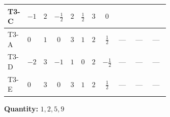 \documentclass[8pt]{article}
\begin{document}
\begin{landscape}
\begin{longtable}{@{}llcccccc >{\raggedright\arraybackslash}p{0.21\linewidth} >{\raggedright\arraybackslash}p{0.21\linewidth} >{\raggedright\arraybackslash}p{0.21\linewidth}@{}}
T3-C & $-1$ & $2$ & $-\frac{1}{2}$ & $2$ & $\frac{1}{2}$ & $3$ & $0$ & \scriptsize\adjustbox{max width=\linewidth}{$\begin{gathered} - \frac{lambda12Inv2 \overline{y_{1}} \overline{y_{2}}}{6 MF}\end{gathered}$} & \scriptsize\adjustbox{max width=\linewidth}{$\begin{gathered} - \frac{\sqrt{3} g_{2}^{2} \overline{y_{1}} \overline{y_{2}}}{8 MF}\end{gathered}$} & \scriptsize\adjustbox{max width=\linewidth}{$\begin{gathered} \frac{\sqrt{3} ye \overline{y_{1}} \overline{y_{2}} \overline{ye}}{24 MF}\end{gathered}$} \\
\midrule
T3-A & $0$ & $1$ & $0$ & $3$ & $1$ & $2$ & $\frac{1}{2}$ & --- & --- & --- \\
\midrule
T3-D & $-2$ & $3$ & $-1$ & $1$ & $0$ & $2$ & $-\frac{1}{2}$ & --- & --- & --- \\
\midrule
T3-E & $0$ & $3$ & $0$ & $3$ & $1$ & $2$ & $\frac{1}{2}$ & --- & --- & --- \\
\midrule
\bottomrule
\end{longtable}
\clearpage
\noindent\textbf{Quantity: }$\mathrm{1,2,5,9}$\par\smallskip

\end{landscape}
\end{document}
